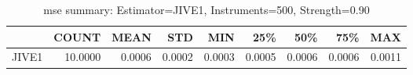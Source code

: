 \begin{table}[ht]
\centering
\caption{mse summary: Estimator=JIVE1, Instruments=500, Strength=0.90}
\begin{tabular}{lrrrrrrrr}
\toprule
 & COUNT & MEAN & STD & MIN & 25\% & 50\% & 75\% & MAX \\
\midrule
JIVE1 & 10.0000 & 0.0006 & 0.0002 & 0.0003 & 0.0005 & 0.0006 & 0.0006 & 0.0011 \\
\bottomrule
\end{tabular}
\end{table}
